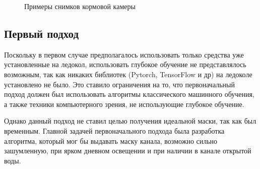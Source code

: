 \begin{figure}[htbp]
    \centering
    \caption{Примеры снимков кормовой камеры}\label{fig:camera_images}
\end{figure}

\subsection{Первый подход}
Поскольку в первом случае предполагалось использовать только средства уже установленные на ледокол, использовать глубокое обучение не представлялось возможным, 
так как никаких библиотек (Pytorch, TensorFlow и др) на ледоколе установлено не было. Это ставило ограничения на то, что первоначальный подход должен был 
использовать алгоритмы классического машинного обучения, а также техники компьютерного зрения, не использующие глубокое обучение.

Однако данный подход не ставил целью получения идеальной маски, так как был временным. Главной задачей первоначального подхода была разработка алгоритма, который 
мог бы выдавать маску канала, возможно сильно зашумленную, при ярком дневном освещении и при наличии в канале открытой воды.


